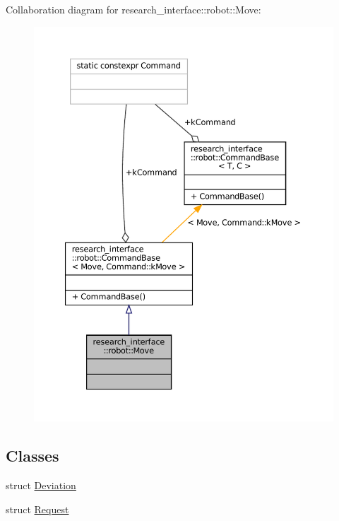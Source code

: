 Collaboration diagram for research\+\_\+interface\+:\+:robot\+:\+:Move\+:
\nopagebreak
\begin{figure}[H]
\begin{center}
\leavevmode
\includegraphics[width=350pt]{structresearch__interface_1_1robot_1_1Move__coll__graph}
\end{center}
\end{figure}
\subsection*{Classes}
\begin{DoxyCompactItemize}
\item 
struct \hyperlink{structresearch__interface_1_1robot_1_1Move_1_1Deviation}{Deviation}
\item 
struct \hyperlink{structresearch__interface_1_1robot_1_1Move_1_1Request}{Request}
\end{DoxyCompactItemize}
